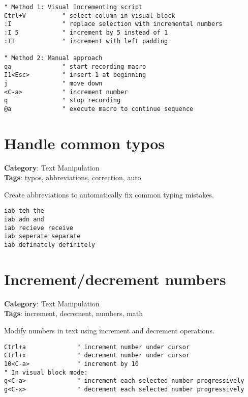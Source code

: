 {{{{{{{{{{{{{\begin{Exa*}{}
\begin{Verbatim}[fontsize=\footnotesize, breaklines, breakanywhere]
" Method 1: Visual Incrementing script
Ctrl+V          " select column in visual block
:I              " replace selection with incremental numbers
:I 5            " increment by 5 instead of 1
:II             " increment with left padding

" Method 2: Manual approach
qa              " start recording macro
I1<Esc>         " insert 1 at beginning
j               " move down
<C-a>           " increment number
q               " stop recording
@a              " execute macro to continue sequence
\end{Verbatim}
\end{Exa*}

\section{Handle common typos}

\textbf{Category}: Text Manipulation\\ \textbf{Tags}: typos, abbreviations, correction, auto
\vspace{0.5cm}

Create abbreviations to automatically fix common typing mistakes.

\begin{Exa*}{}
\begin{Verbatim}[fontsize=\footnotesize, breaklines, breakanywhere]
iab teh the
iab adn and
iab recieve receive
iab seperate separate
iab definately definitely
\end{Verbatim}
\end{Exa*}

\section{Increment/decrement numbers}

\textbf{Category}: Text Manipulation\\ \textbf{Tags}: increment, decrement, numbers, math
\vspace{0.5cm}

Modify numbers in text using increment and decrement operations.

\begin{Exa*}{}
\begin{Verbatim}[fontsize=\footnotesize, breaklines, breakanywhere]
Ctrl+a              " increment number under cursor
Ctrl+x              " decrement number under cursor
10<C-a>             " increment by 10
" In visual block mode:
g<C-a>              " increment each selected number progressively
g<C-x>              " decrement each selected number progressively
\end{Verbatim}
\end{Exa*}

}}}}}}}}}}}}}
